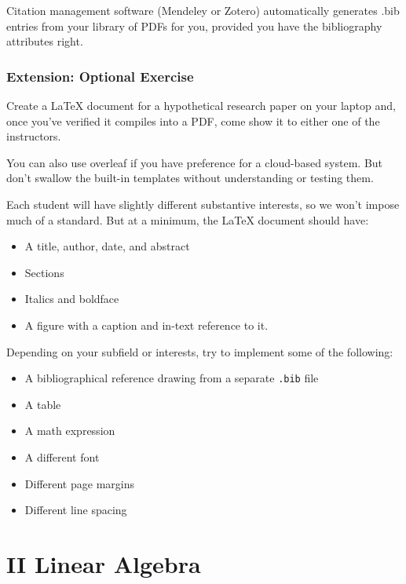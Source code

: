 \documentclass[
  letterpaper,
]{book}
\providecommand{\tightlist}{%
  \setlength{\itemsep}{0pt}\setlength{\parskip}{0pt}}\usepackage{longtable,booktabs,array}
\theoremstyle{definition}
\theoremstyle{definition}
\theoremstyle{plain}
\theoremstyle{definition}
\theoremstyle{plain}
\theoremstyle{plain}
\theoremstyle{remark}
\begin{document}
Citation management software (Mendeley or Zotero) automatically
generates .bib entries from your library of PDFs for you, provided you
have the bibliography attributes right.

\hypertarget{extension-optional-exercise}{%
\section*{Extension: Optional
Exercise}\label{extension-optional-exercise}}

Create a LaTeX document for a hypothetical research paper on your laptop
and, once you've verified it compiles into a PDF, come show it to either
one of the instructors.

You can also use overleaf if you have preference for a cloud-based
system. But don't swallow the built-in templates without understanding
or testing them.

Each student will have slightly different substantive interests, so we
won't impose much of a standard. But at a minimum, the LaTeX document
should have:

\begin{itemize}
\tightlist
\item
  A title, author, date, and abstract
\item
  Sections
\item
  Italics and boldface
\item
  A figure with a caption and in-text reference to it.
\end{itemize}

Depending on your subfield or interests, try to implement some of the
following:

\begin{itemize}
\tightlist
\item
  A bibliographical reference drawing from a separate \texttt{.bib} file
\item
  A table
\item
  A math expression
\item
  A different font
\item
  Different page margins
\item
  Different line spacing
\end{itemize}

\part{II Linear Algebra}
\end{document}
